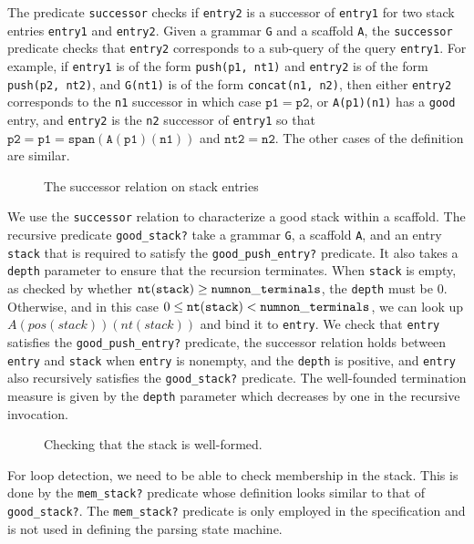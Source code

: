 \documentclass[sigplan,10pt,anonymous,review]{acmart}\settopmatter{printfolios=true,printccs=false,printacmref=false}
\begin{document}
\begin{CCSXML}
The predicate \texttt{successor} checks if \texttt{entry2} is a successor of \texttt{entry1} for two stack entries \texttt{entry1} and \texttt{entry2}\@.
Given a grammar \texttt{G} and a scaffold \texttt{A}, the \texttt{successor} predicate checks that \texttt{entry2} corresponds to a sub-query of the query \texttt{entry1}\@.  For example, if \texttt{entry1} is of the form \texttt{push(p1, nt1)}
and \texttt{entry2} is of the form \texttt{push(p2, nt2)}, and \texttt{G(nt1)}
is of the form \texttt{concat(n1, n2)}, then either \texttt{entry2} corresponds to the \texttt{n1} successor in which case $\mathtt{p1} = \mathtt{p2}$, or \texttt{A(p1)(n1)} has a \texttt{good} entry, and \texttt{entry2} is the \texttt{n2} successor of \texttt{entry1} so that $\mathtt{p2} = \mathtt{p1 = span(A(p1)(n1))}$ and $\mathtt{nt2} = \mathtt{n2}$\@.  The other cases of the definition are similar.  
\begin{figure}[h!]
			
			\caption{The successor relation on stack entries}
			\label{pvs:successor}
\end{figure}

We use the \texttt{successor} relation to characterize a good stack within
a scaffold.  The recursive predicate \texttt{good\_stack?} take a grammar \texttt{G}, a scaffold \texttt{A}, and an entry \texttt{stack} that is required to
satisfy the \texttt{good\_push\_entry?} predicate.  It also takes a \texttt{depth}
parameter to ensure that the recursion terminates.  When \texttt{stack} is empty,
as checked by whether $\mathtt{nt(stack)} \geq \mathtt{num\-non\_terminals}$,
the \texttt{depth} must be $0$.  Otherwise, and in this case
$0\leq \mathtt{nt(stack)} < \mathtt{num\-non\_terminals}$, we can look up
$A(pos(stack))(nt(stack))$ and bind it to \texttt{entry}\@.  We check that
\texttt{entry} satisfies the \texttt{good\_push\_entry?} predicate,
the successor relation holds between \texttt{entry} and \texttt{stack}
when \texttt{entry} is nonempty, and the \texttt{depth} is positive, and
\texttt{entry} also recursively satisfies the \texttt{good\_stack?} predicate.
The well-founded termination measure is given by the \texttt{depth} parameter
which decreases by one in the recursive invocation.  
\begin{figure}[h!]
			
			\caption{Checking that the stack is well-formed. }
			\label{pvs:goodstack}
\end{figure}

For loop detection, we need to be able to check membership in the stack.
This is done by the \texttt{mem\_stack?} predicate whose definition looks
similar to that of \texttt{good\_stack?}\@.  The \texttt{mem\_stack?} predicate is only employed in the specification and is not used in defining the parsing
state machine.  
                      

\end{CCSXML}
\end{document}
